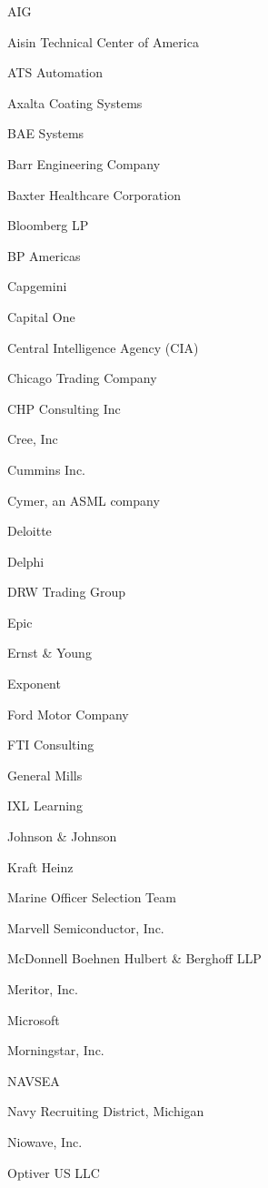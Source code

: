 \documentclass[twoside]{article}
\begin{document}
\begin{center}
\begin{multicols}{5}
        \begin{FlushLeft}
        \begin{compactitem}
        \item AIG
\item Aisin Technical Center of America
\item ATS Automation
\item Axalta Coating Systems
\item BAE Systems
\item Barr Engineering Company
\item Baxter Healthcare Corporation
\item Bloomberg LP
\item BP Americas
\item Capgemini
\item Capital One
\item Central Intelligence Agency (CIA)
\item Chicago Trading Company
\item CHP Consulting Inc
\item Cree, Inc
\item Cummins Inc.
\item Cymer, an ASML company
\item Deloitte
\item Delphi
\item DRW Trading Group
\item Epic
\item Ernst \& Young
\item Exponent
\item Ford Motor Company
\item FTI Consulting
\item General Mills
\item IXL Learning
\item Johnson \& Johnson
\item Kraft Heinz
\item Marine Officer Selection Team
\item Marvell Semiconductor, Inc.
\item McDonnell Boehnen Hulbert \& Berghoff LLP
\item Meritor, Inc.
\item Microsoft
\item Morningstar, Inc.
\item NAVSEA
\item Navy Recruiting District, Michigan
\item Niowave, Inc.
\item Optiver US LLC

\end{compactitem}
\end{FlushLeft}
\end{multicols}
\end{center}
\end{document}
